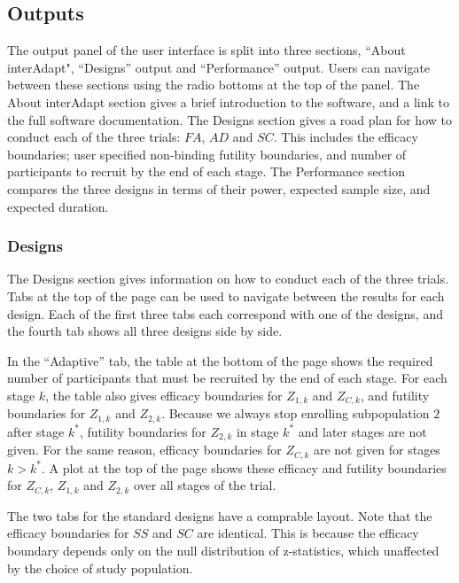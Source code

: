\documentclass[article]{jss}
\begin{document}
\subsection{Outputs}
\label{sub:outputs}

The output panel of the user interface is split into three sections, ``About interAdapt", ``Designs'' output and ``Performance'' output. Users can navigate between these sections using the radio bottoms at the top of the panel. The About interAdapt section gives a brief introduction to the software, and a link to the full software documentation. The Designs section gives a road plan for how to conduct each of the three trials: $FA$, $AD$ and $SC$. This includes the efficacy boundaries; user specified non-binding futility boundaries, and number of participants to recruit by the end of each stage. The Performance section compares the three designs in terms of their power, expected sample size, and expected duration. 



\subsubsection{Designs}
\label{sub:design}

The Designs section gives information on how to conduct each of the three trials. Tabs at the top of the page can be used to navigate between the results for each design. Each of the first three tabs each correspond with one of the designs, and the fourth tab shows all three designs side by side. 

In the “Adaptive” tab, the table at the bottom of the page shows the required number of participants that must be recruited by the end of each stage. For each stage $k$, the table also gives efficacy boundaries for $Z_{1,k}$ and $Z_{C,k}$, and futility boundaries for $Z_{1,k}$ and $Z_{2,k}$. Because we always stop enrolling subpopulation $2$ after stage $k^*$, futility boundaries for $Z_{2,k}$ in stage $k^*$ and later stages are not given. For the same reason, efficacy boundaries for $Z_{C,k}$ are not given for stages $k>k^*$. A plot at the top of the page shows these efficacy and futility boundaries for $Z_{C,k}$, $Z_{1,k}$ and $Z_{2,k}$ over all stages of the trial.

The two tabs for the standard designs have a comprable layout. Note that the efficacy boundaries for $SS$ and $SC$ are identical. This is because the efficacy boundary depends only on the null distribution of z-statistics, which unaffected by the choice of study population.
\end{document}
